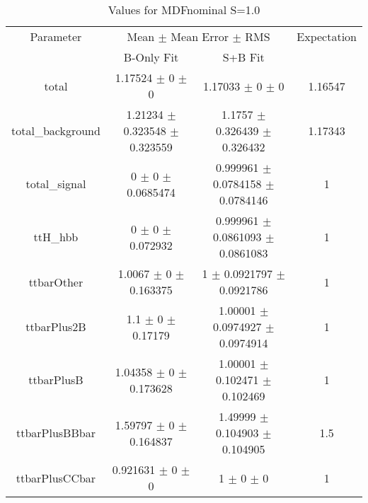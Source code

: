 \begin{table}
\centering
\caption{Values for MDFnominal S=1.0}
\begin{tabular}{cccc}
\toprule
Parameter & \multicolumn{2}{c}{Mean $\pm$ Mean Error $\pm$ RMS} & Expectation\\
 & B-Only Fit & S+B Fit & \\
\midrule
total & \num{1.17524} $\pm$ \num{0} $\pm$ \num{0} & \num{1.17033} $\pm$ \num{0} $\pm$ \num{0} & \num{1.16547}\\
total\_background & \num{1.21234} $\pm$ \num{0.323548} $\pm$ \num{0.323559} & \num{1.1757} $\pm$ \num{0.326439} $\pm$ \num{0.326432} & \num{1.17343}\\
total\_signal & \num{0} $\pm$ \num{0} $\pm$ \num{0.0685474} & \num{0.999961} $\pm$ \num{0.0784158} $\pm$ \num{0.0784146} & \num{1}\\
ttH\_hbb & \num{0} $\pm$ \num{0} $\pm$ \num{0.072932} & \num{0.999961} $\pm$ \num{0.0861093} $\pm$ \num{0.0861083} & \num{1}\\
ttbarOther & \num{1.0067} $\pm$ \num{0} $\pm$ \num{0.163375} & \num{1} $\pm$ \num{0.0921797} $\pm$ \num{0.0921786} & \num{1}\\
ttbarPlus2B & \num{1.1} $\pm$ \num{0} $\pm$ \num{0.17179} & \num{1.00001} $\pm$ \num{0.0974927} $\pm$ \num{0.0974914} & \num{1}\\
ttbarPlusB & \num{1.04358} $\pm$ \num{0} $\pm$ \num{0.173628} & \num{1.00001} $\pm$ \num{0.102471} $\pm$ \num{0.102469} & \num{1}\\
ttbarPlusBBbar & \num{1.59797} $\pm$ \num{0} $\pm$ \num{0.164837} & \num{1.49999} $\pm$ \num{0.104903} $\pm$ \num{0.104905} & \num{1.5}\\
ttbarPlusCCbar & \num{0.921631} $\pm$ \num{0} $\pm$ \num{0} & \num{1} $\pm$ \num{0} $\pm$ \num{0} & \num{1}\\
\bottomrule
\end{tabular}
\end{table}